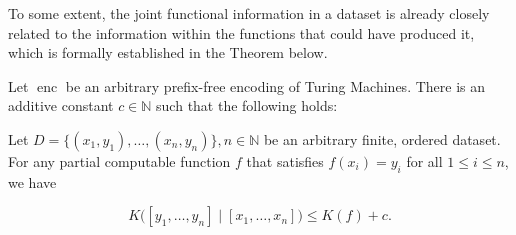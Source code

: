 To some extent, the joint functional information in a dataset is already closely related to the information within the functions that could have produced it, which is formally established in the Theorem below.
\begin{theorem}
	\label{theorem:dataset-joint-functional-information-bound}
	Let $\operatorname{enc}$ be an arbitrary prefix-free encoding of Turing Machines.
	There is an additive constant $c\in\mathbb{N}$ such that the following holds:
	
	Let $D=\{(x_1,y_1),\dots,(x_n,y_n)\},n\in\mathbb{N}$ be an arbitrary finite, ordered dataset.
	For any partial computable function $f$ that satisfies $f(x_i)=y_i$ for all $1\leq i\leq n$, we have
	
	\begin{equation}
		K\bigl([y_1,\dots,y_n] \mid [x_1,\dots,x_n]\bigr) \leq K(f) + c.
	\end{equation}
\end{theorem}
